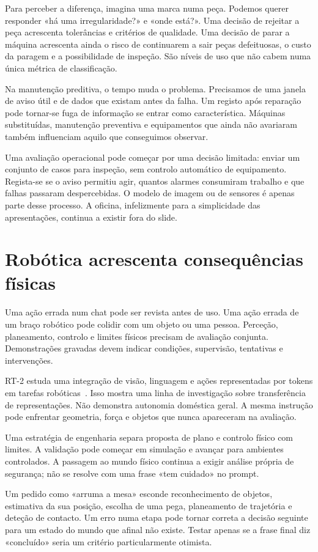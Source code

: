 Para perceber a diferença, imagina uma marca numa peça. Podemos querer responder «há uma irregularidade?» e «onde está?». Uma decisão de rejeitar a peça acrescenta tolerâncias e critérios de qualidade. Uma decisão de parar a máquina acrescenta ainda o risco de continuarem a sair peças defeituosas, o custo da paragem e a possibilidade de inspeção. São níveis de uso que não cabem numa única métrica de classificação.

Na manutenção preditiva, o tempo muda o problema. Precisamos de uma janela de aviso útil e de dados que existam antes da falha. Um registo após reparação pode tornar-se fuga de informação se entrar como característica. Máquinas substituídas, manutenção preventiva e equipamentos que ainda não avariaram também influenciam aquilo que conseguimos observar.

Uma avaliação operacional pode começar por uma decisão limitada: enviar um conjunto de casos para inspeção, sem controlo automático de equipamento. Regista-se se o aviso permitiu agir, quantos alarmes consumiram trabalho e que falhas passaram despercebidas. O modelo de imagem ou de sensores é apenas parte desse processo. A oficina, infelizmente para a simplicidade das apresentações, continua a existir fora do slide.

\section{Robótica acrescenta consequências físicas}
Uma ação errada num chat pode ser revista antes de uso. Uma ação errada de um braço robótico pode colidir com um objeto ou uma pessoa. Perceção, planeamento, controlo e limites físicos precisam de avaliação conjunta. Demonstrações gravadas devem indicar condições, supervisão, tentativas e intervenções.

RT-2 estuda uma integração de visão, linguagem e ações representadas por tokens em tarefas robóticas~\citep{rt22023}. Isso mostra uma linha de investigação sobre transferência de representações. Não demonstra autonomia doméstica geral. A mesma instrução pode enfrentar geometria, força e objetos que nunca apareceram na avaliação.

Uma estratégia de engenharia separa proposta de plano e controlo físico com limites. A validação pode começar em simulação e avançar para ambientes controlados. A passagem ao mundo físico continua a exigir análise própria de segurança; não se resolve com uma frase «tem cuidado» no prompt.

Um pedido como «arruma a mesa» esconde reconhecimento de objetos, estimativa da sua posição, escolha de uma pega, planeamento de trajetória e deteção de contacto. Um erro numa etapa pode tornar correta a decisão seguinte para um estado do mundo que afinal não existe. Testar apenas se a frase final diz «concluído» seria um critério particularmente otimista.

